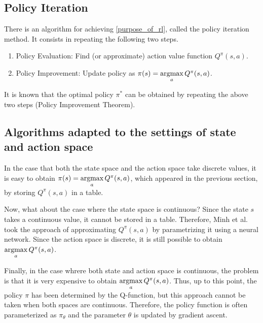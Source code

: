 \documentclass[english, dvipdfmx]{ampmt}             %
\newcommand{\argmax}{\mathop{\rm argmax}\limits}
\begin{document}
\subsection{Policy Iteration}
There is an algorithm for achieving \eqref{purpose_of_rl}, called the policy iteration method. It consists in repeating the following two steps.
\begin{enumerate}
	\item Policy Evaluation: Find (or approximate) action value function $Q^{\pi}(s,a)$.
	\item Policy Improvement: Update policy as $\pi(s)=\argmax_aQ^{\pi}(s,a)$.
\end{enumerate}
It is known that the optimal policy $\pi^{*}$ can be obtained by repeating the above two steps (Policy Improvement Theorem).





\subsection{Algorithms adapted to the settings of state and action space}
\label{sec:policy_improvement}
In the case that both the state space and the action space take discrete values, it is easy to obtain
$\pi(s)=\argmax_aQ^{\pi}(s,a)$, which appeared in the previous section, by storing $Q^{\pi}(s,a)$ in a table.\par
Now, what about the case where the state space is continuous? Since the state $s$ takes a continuous value, it cannot be stored in a table. Therefore, Minh et al.\cite{DQN} took the approach of approximating $Q^{\pi}(s,a)$ by parametrizing it using a neural network. Since the action space is discrete, it is still possible to obtain $\argmax_aQ^{\pi}(s,a)$. \par
Finally, in the case whrere both state and action space is continuous, the problem is that it is very expensive to obtain $\argmax_aQ^{\pi}(s,a)$. Thus, up to this point, the policy $\pi$ has been determined by the Q-function, but this approach cannot be taken when both spaces are continuous. 
Therefore, the policy function is often parameterized as $\pi_{\theta}$ and the parameter $\theta$ is updated by gradient ascent. 
\end{document}
